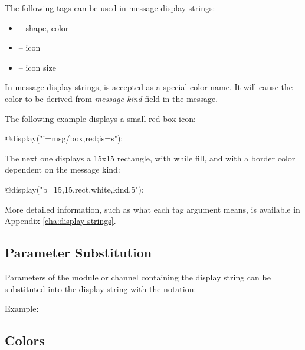 The following tags can be used in message display strings:

\begin{itemize}
  \item {} -- shape, color
  \item {} -- icon
  \item {} -- icon size
\end{itemize}

\begin{note}
   In message display strings,  is accepted as a special color name.
   It will cause the color to be derived from \textit{message kind} field in the message.
\end{note}

The following example displays a small red box icon:

\begin{ned}
@display("i=msg/box,red;is=s");
\end{ned}

The next one displays a 15x15 rectangle, with while fill, and with a border
color dependent on the message kind:

\begin{ned}
@display("b=15,15,rect,white,kind,5");
\end{ned}

More detailed information, such as what each tag argument means, is
available in Appendix \ref{cha:display-strings}.


\subsection{Parameter Substitution}
\label{sec:graphics:displaystring-parameter-substitution}

Parameters of the module or channel containing the
display string can be substituted into the display string
with the  notation:

Example:


\subsection{Colors}
\label{sec:graphics:displaystring-colors}

